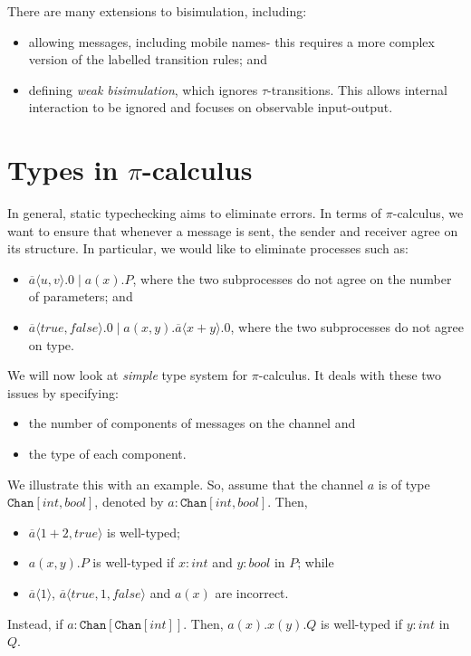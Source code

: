 \documentclass[a4paper, openany]{memoir}
\theoremstyle{definition}
\begin{document}
    There are many extensions to bisimulation, including:
    \begin{itemize}
        \item allowing messages, including mobile names- this requires a more complex version of the labelled transition rules; and
        \item defining \emph{weak bisimulation}, which ignores $\tau$-transitions. This allows internal interaction to be ignored and focuses on observable input-output.
    \end{itemize}
    \newpage

    \section{Types in $\pi$-calculus}
    In general, static typechecking aims to eliminate errors. In terms of $\pi$-calculus, we want to ensure that whenever a message is sent, the sender and receiver agree on its structure. In particular, we would like to eliminate processes such as:
    \begin{itemize}
        \item $\overline{a} \langle u, v \rangle.0 \mid a(x).P$, where the two subprocesses do not agree on the number of parameters; and
        \item $\overline{a} \langle \textit{true}, \textit{false} \rangle.0 \mid a(x, y).\overline{a} \langle x + y \rangle.0$, where the two subprocesses do not agree on type.
    \end{itemize}

    We will now look at \emph{simple} type system for $\pi$-calculus. It deals with these two issues by specifying:
    \begin{itemize}
        \item the number of components of messages on the channel and
        \item the type of each component.
    \end{itemize}
    We illustrate this with an example. So, assume that the channel $a$ is of type $\texttt{Chan}[\textit{int}, \textit{bool}]$, denoted by $a \colon \texttt{Chan}[\textit{int}, \textit{bool}]$. Then,
    \begin{itemize}
        \item $\overline{a} \langle 1 + 2, \textit{true} \rangle$ is well-typed;
        \item $a(x, y).P$ is well-typed if $x \colon \textit{int}$ and $y \colon \textit{bool}$ in $P$; while
        \item $\overline{a} \langle 1 \rangle$, $\overline{a} \langle true, 1, false \rangle$ and $a(x)$ are incorrect.
    \end{itemize}
    Instead, if $a \colon \texttt{Chan}[\texttt{Chan}[\textit{int}]]$. Then, $a(x).x(y).Q$ is well-typed if $y \colon \textit{int}$ in $Q$.
\end{document}
